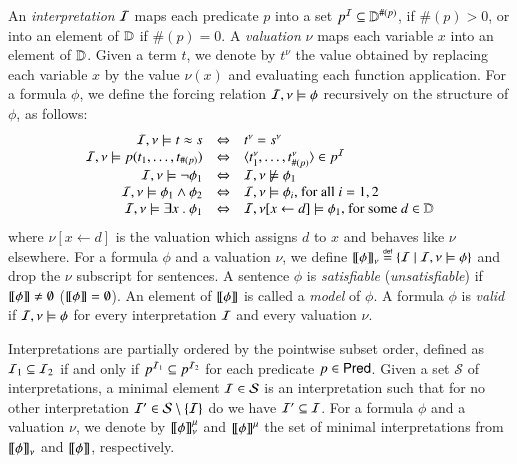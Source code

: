 \documentclass{llncs}
\begin{document}

An \emph{interpretation} $\mathcal{I}$ maps each predicate $p$ into a set $p^{\mathcal{I}}
\subseteq \mathbb{D}^{\#(p)}$, if $\#(p)>0$, or into an element of $\mathbb{D}$
if $\#(p)=0$. A \emph{valuation} $\nu$ maps each variable $x$ into an
element of $\mathbb{D}$. Given a term $t$, we denote by $t^\nu$ the value
obtained by replacing each variable $x$ by the value $\nu(x)$ and
evaluating each function application. For a formula $\phi$, we define
the forcing relation $\mathcal{I},\nu \models \phi$ recursively on the
structure of $\phi$, as follows:
\[
\begin{array}{rcl}
\mathcal{I},\nu \models t \approx s & \Leftrightarrow & t^\nu=s^\nu \\
\mathcal{I},\nu \models p(t_1,\ldots,t_{\#(p)}) & \Leftrightarrow & \langle t_1^\nu,\ldots,t_{\#(p)}^\nu \rangle \in p^{\mathcal{I}} \\
\mathcal{I},\nu \models \neg\phi_1 & \Leftrightarrow & \mathcal{I},\nu \not\models \phi_1 \\
\mathcal{I},\nu \models \phi_1 \wedge \phi_2 & \Leftrightarrow & \mathcal{I},\nu \models \phi_i \text{, for all } i=1,2 \\ 
\mathcal{I},\nu \models \exists x ~.~ \phi_1 & \Leftrightarrow & \mathcal{I},\nu[x\leftarrow d] \models \phi_1 \text{, for some } d \in \mathbb{D} 
\end{array}
\]
where $\nu[x\leftarrow d]$ is the valuation which assigns $d$ to $x$
and behaves like $\nu$ elsewhere. For a formula $\phi$ and a valuation
$\nu$, we define ${\bf [\![} \phi {\bf ]\!]}_\nu \stackrel{\scriptscriptstyle{\mathsf{def}}}{=} \{ \mathcal{I} \mid \mathcal{I},\nu \models
  \phi \}$ and drop the $\nu$ subscript for sentences. A sentence $\phi$
is \emph{satisfiable} (\emph{unsatisfiable}) if
${\bf [\![} \phi {\bf ]\!]}\neq\emptyset$ (${\bf [\![} \phi {\bf ]\!]}=\emptyset$). An element of
${\bf [\![} \phi {\bf ]\!]}$ is called a \emph{model} of $\phi$. A formula $\phi$ is
\emph{valid} if $\mathcal{I},\nu \models \phi$ for every interpretation $\mathcal{I}$
and every valuation $\nu$.

Interpretations are partially ordered by the pointwise subset order,
defined as $\mathcal{I}_1 \subseteq \mathcal{I}_2$ if and only if $p^{\mathcal{I}_1} \subseteq
p^{\mathcal{I}_2}$ for each predicate $p \in \mathsf{Pred}$. Given a set $\mathcal{S}$
of interpretations, a minimal element $\mathcal{I} \in \mathcal{S}$ is an
interpretation such that for no other interpretation $\mathcal{I}' \in
\mathcal{S} \setminus \{ \mathcal{I} \}$ do we have $\mathcal{I}' \subseteq \mathcal{I}$. For a
formula $\phi$ and a valuation $\nu$, we denote by ${\bf [\![} \phi {\bf ]\!]}^\mu_\nu$
and ${\bf [\![} \phi {\bf ]\!]}^\mu$ the set of minimal interpretations from
${\bf [\![} \phi {\bf ]\!]}_\nu$ and ${\bf [\![} \phi {\bf ]\!]}$, respectively.
\end{document}
